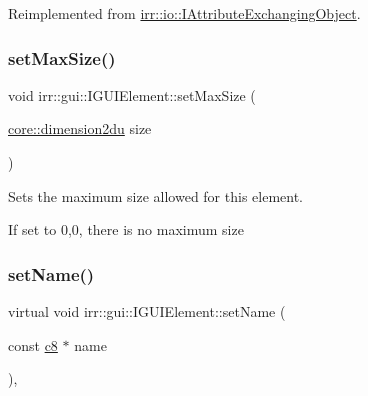 Reimplemented from \hyperlink{classirr_1_1io_1_1IAttributeExchangingObject_a587f7b633366968f0488e1099e9172ef}{irr\+::io\+::\+I\+Attribute\+Exchanging\+Object}.

\mbox{\label{classirr_1_1gui_1_1IGUIElement_ae80ad7253fb9fb2ebbeda2a8148fff3e}} 
\subsubsection{\texorpdfstring{set\+Max\+Size()}{setMaxSize()}}
{\footnotesize\ttfamily void irr\+::gui\+::\+I\+G\+U\+I\+Element\+::set\+Max\+Size (\begin{DoxyParamCaption}\item[{\hyperlink{namespaceirr_1_1core_ad2e562e3219072e2f7fc7c2bba0ef0cb}{core\+::dimension2du}}]{size }\end{DoxyParamCaption})\hspace{0.3cm}{\ttfamily [inline]}}



Sets the maximum size allowed for this element. 

If set to 0,0, there is no maximum size \mbox{\label{classirr_1_1gui_1_1IGUIElement_a47ce14d1a973137b6cbe91a047df2ebe}} 
\subsubsection{\texorpdfstring{set\+Name()}{setName()}\hspace{0.1cm}{\footnotesize\ttfamily [1/2]}}
{\footnotesize\ttfamily virtual void irr\+::gui\+::\+I\+G\+U\+I\+Element\+::set\+Name (\begin{DoxyParamCaption}\item[{const \hyperlink{namespaceirr_a9395eaea339bcb546b319e9c96bf7410}{c8} $\ast$}]{name }\end{DoxyParamCaption})\hspace{0.3cm}{\ttfamily [inline]}, {\ttfamily [virtual]}}



